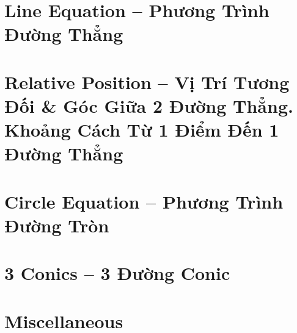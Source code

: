 \documentclass{article}
\newtheorem{baitoan}{}
\begin{document}
%	
%
%	
%
%	


\section{Line Equation -- Phương Trình Đường Thẳng}


\section{Relative Position -- Vị Trí Tương Đối \& Góc Giữa 2 Đường Thẳng. Khoảng Cách Từ 1 Điểm Đến 1 Đường Thẳng}


\section{Circle Equation -- Phương Trình Đường Tròn}


\section{3 Conics -- 3 Đường Conic}


\section{Miscellaneous}


\printbibliography[heading=bibintoc]
	
\end{document}
